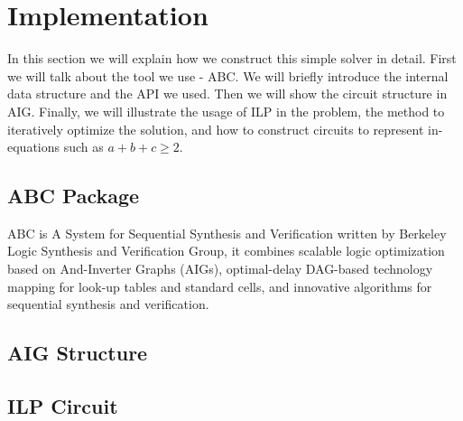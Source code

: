 \section{Implementation}
In this section we will explain how we construct this simple solver in detail. First we will talk about the tool we use - ABC. We will briefly introduce the internal data structure and the API we used. Then we will show the circuit structure in AIG. Finally, we will illustrate the usage of ILP in the problem, the method to iteratively optimize the solution, and how to construct circuits to represent in-equations such as $a+b+c \geq 2$.
\subsection{ABC Package}
ABC is A System for Sequential Synthesis and Verification written by Berkeley Logic Synthesis and Verification Group, it combines scalable logic optimization based on And-Inverter Graphs (AIGs), optimal-delay DAG-based technology mapping for look-up tables and standard cells, and innovative algorithms for sequential synthesis and verification.
\subsection{AIG Structure}
\subsection{ILP Circuit}
